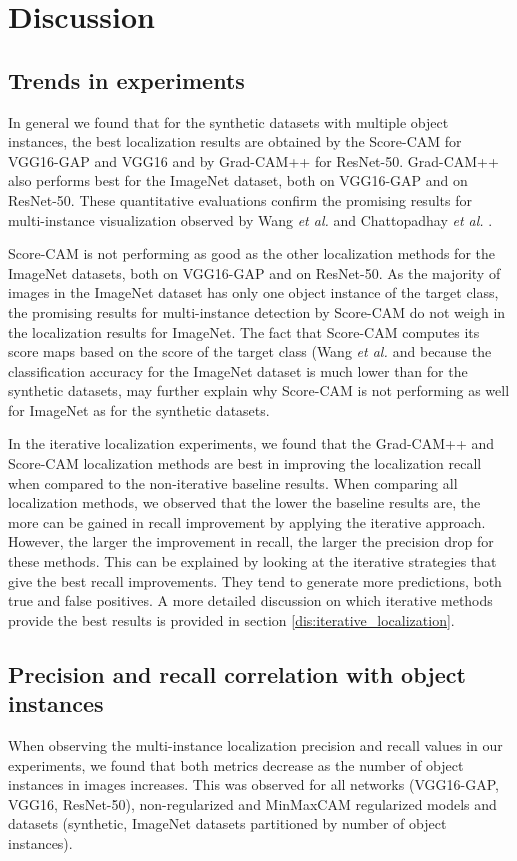 \chapter{Discussion} \label{ch:discussion}

\section{Trends in experiments} \label{dis:trends_in_experiments}
In general we found that for the synthetic datasets with multiple object instances, the best localization results are obtained by the Score-CAM for VGG16-GAP and VGG16 and by Grad-CAM++ for ResNet-50. Grad-CAM++ also performs best for the ImageNet dataset, both on VGG16-GAP and on ResNet-50. These quantitative evaluations confirm the promising results for multi-instance visualization observed by Wang \textit{et al.} \cite{wang2020score} and Chattopadhay \textit{et al.} \cite{chattopadhay2018grad}.

Score-CAM is not performing as good as the other localization methods for the ImageNet datasets, both on VGG16-GAP and on ResNet-50. As the majority of images in the ImageNet dataset has only one object instance of the target class, the promising results for multi-instance detection by Score-CAM do not weigh in the localization results for ImageNet. The fact that Score-CAM computes its score maps based on the score of the target class (Wang \textit{et al. \cite{wang2020score}} and because the classification accuracy for the ImageNet dataset is much lower than for the synthetic datasets, may further explain why Score-CAM is not performing as well for ImageNet as for the synthetic datasets.

In the iterative localization experiments, we found that the Grad-CAM++ and Score-CAM localization methods are best in improving the localization recall when compared to the non-iterative baseline results. When comparing all localization methods, we observed that the lower the baseline results are, the more can be gained in recall improvement by applying the iterative approach. However, the larger the improvement in recall, the larger the precision drop for these methods. This can be explained by looking at the iterative strategies that give the best recall improvements. They tend to generate more predictions, both true and false positives. A more detailed discussion on which iterative methods provide the best results is provided in section \ref{dis:iterative_localization}.

\section{Precision and recall correlation with object instances}
When observing the multi-instance localization precision and recall values in our experiments, we found that both metrics decrease as the number of object instances in images increases. This was observed for all networks (VGG16-GAP, VGG16, ResNet-50), non-regularized and MinMaxCAM regularized models and datasets (synthetic, ImageNet datasets partitioned by number of object instances).

